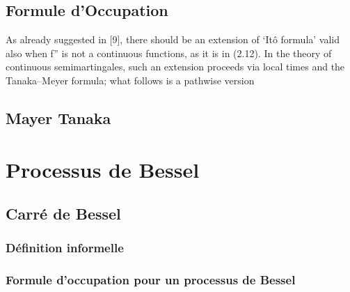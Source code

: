 \documentclass[openany]{book}
\theoremstyle{thmfont}
\theoremstyle{deffont}
\theoremstyle{thmfont}
\theoremstyle{deffont}
\begin{document}
\section{Formule d'Occupation}

{\color{red}As already suggested in [9], there should be an extension of ‘Itô formula’ valid also when f'' is not a continuous
functions, as it is in (2.12). In the theory of continuous semimartingales, such an extension proceeds via local times
and the Tanaka–Meyer formula; what follows is a pathwise version}

\section{Mayer Tanaka}

\chapter{Processus de Bessel}
\section{Carré de Bessel}
\subsection{Définition informelle}
\subsection{Formule d'occupation pour un processus de Bessel}
\end{document}
